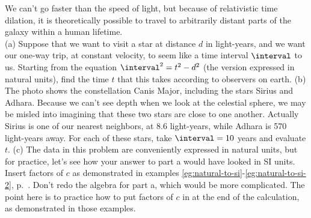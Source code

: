 We can't go faster than the speed of light,
but because of relativistic time dilation, it is theoretically possible to travel to
arbitrarily distant parts of the galaxy within a human lifetime.\\
(a) Suppose that we want to visit a star at distance $d$ in light-years,
and we want our one-way trip, at constant velocity, to seem like a time interval $\interval$
to us. Starting from the equation $\interval^2=t^2-d^2$ (the version expressed in natural units),
find the time $t$ that this takes according to observers on earth.\answercheck\hwendpart
(b) The photo shows the constellation Canis Major, including the stars Sirius and Adhara.
Because we can't see depth when we look at the celestial sphere, we may be misled into
imagining that these two stars are close to one another. Actually Sirius is one of
our nearest neighbors, at 8.6 light-years, while Adhara is 570 light-years away.
For each of these stars, take $\interval=10$ years and evaluate $t$.\answercheck\hwendpart
(c) The data in this problem are conveniently expressed in natural units, but
for practice, let's see how your answer to part a would have looked in SI units.
Insert factors of $c$ as demonstrated in examples \ref{eg:natural-to-si}-\ref{eg:natural-to-si-2},
p.~\pageref{eg:natural-to-si}. Don't redo the algebra for part a, which would be more
complicated. The point here is to practice
how to put factors of $c$ in at the end of the calculation, as demonstrated in those
examples.\answercheck
